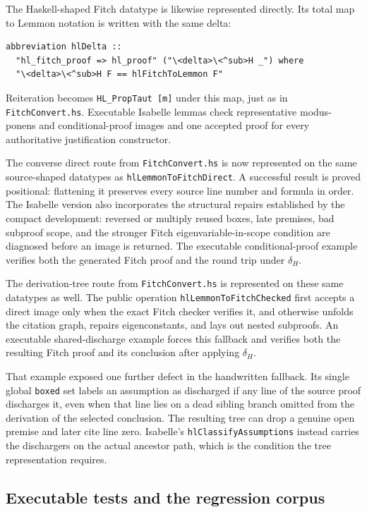 \documentclass[11pt]{article}
\theoremstyle{plain}
\theoremstyle{definition}
\theoremstyle{remark}
\begin{document}
The Haskell-shaped Fitch datatype is likewise represented directly. Its total
map to Lemmon notation is written with the same delta:

\begin{lstlisting}[language={}]
abbreviation hlDelta ::
  "hl_fitch_proof => hl_proof" ("\<delta>\<^sub>H _") where
  "\<delta>\<^sub>H F == hlFitchToLemmon F"
\end{lstlisting}

\noindent Reiteration becomes \verb|HL_PropTaut [m]| under this map, just as
in \verb|FitchConvert.hs|. Executable Isabelle lemmas check representative
modus-ponens and conditional-proof images and one accepted proof for every
authoritative justification constructor.

The converse direct route from \verb|FitchConvert.hs| is now represented on
the same source-shaped datatypes as \verb|hlLemmonToFitchDirect|.  A successful
result is proved positional: flattening it preserves every source line number
and formula in order.  The Isabelle version also incorporates the structural
repairs established by the compact development: reversed or multiply reused
boxes, late premises, bad subproof scope, and the stronger Fitch
eigenvariable-in-scope condition are diagnosed before an image is returned.
The executable conditional-proof example verifies both the generated Fitch
proof and the round trip under $\delta_H$.

The derivation-tree route from \verb|FitchConvert.hs| is represented on these
same datatypes as well.  The public operation
\verb|hlLemmonToFitchChecked| first accepts a direct image only when the exact
Fitch checker verifies it, and otherwise unfolds the citation graph, repairs
eigenconstants, and lays out nested subproofs.  An executable shared-discharge
example forces this fallback and verifies both the resulting Fitch proof and
its conclusion after applying $\delta_H$.

That example exposed one further defect in the handwritten fallback.  Its
single global \verb|boxed| set labels an assumption as discharged if any line
of the source proof discharges it, even when that line lies on a dead sibling
branch omitted from the derivation of the selected conclusion.  The resulting
tree can drop a genuine open premise and later cite line zero.  Isabelle's
\verb|hlClassifyAssumptions| instead carries the dischargers on the actual
ancestor path, which is the condition the tree representation requires.

\subsection{Executable tests and the regression corpus}
\end{document}
